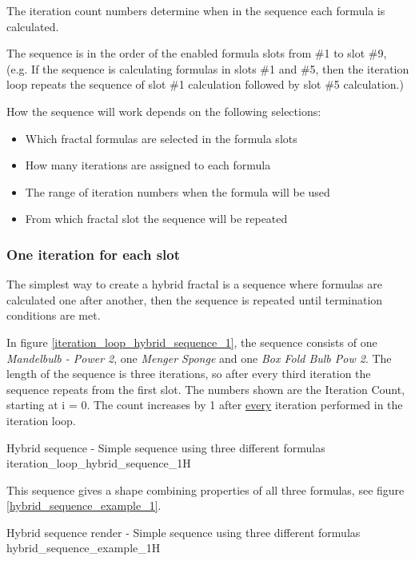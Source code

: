 The iteration count numbers determine when in the sequence each formula is calculated.

The sequence is in the order of the enabled formula slots from \#1 to slot \#9, (e.g. If the sequence is calculating formulas in slots
\#1 and \#5, then the iteration loop repeats the sequence of slot \#1 calculation followed by slot
\#5 calculation.)

How the sequence will work depends on the following selections:
\begin{itemize}
	\item Which fractal formulas are selected in the formula slots
	\item How many iterations are assigned to each formula
	\item The range of iteration numbers when the formula will be used
	\item From which fractal slot the sequence will be repeated
\end{itemize}

\subsubsection{One iteration for each slot}

The simplest way to create a hybrid fractal is a sequence where formulas are calculated one after another, then the sequence is repeated until termination conditions are met.

In figure \ref{iteration_loop_hybrid_sequence_1}, the sequence consists of one \emph{Mandelbulb - Power 2}, one \emph{Menger Sponge} and
one \emph{Box Fold Bulb Pow 2}. The length of the sequence is three iterations, so after every third iteration the sequence repeats from the first slot. The numbers shown are the Iteration Count, starting at i = 0. The count increases by 1 after \underline{every} iteration performed in the iteration loop.

{Hybrid sequence - Simple sequence using three different formulas}
{iteration_loop_hybrid_sequence_1}{H}

This sequence gives a shape combining properties of all three
formulas, see figure \ref{hybrid_sequence_example_1}.

{Hybrid sequence render - Simple sequence using three different formulas}
{hybrid_sequence_example_1}{H}

